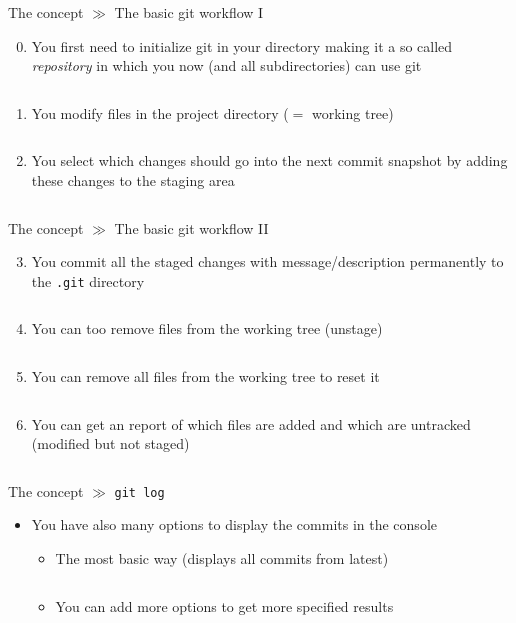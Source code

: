 \documentclass[10pt]{beamer}
\begin{document}
\begin{frame}{The concept $\gg$ The basic git workflow I}
	\begin{enumerate}\setcounter{enumi}{-1}
		\item You first need to initialize git in your directory making it a so called \textit{repository} in which you now (and all subdirectories) can use git
		\inputminted[bgcolor=lightGreyCustom,fontsize=\scriptsize]{sh}{./resources/git_workflow_00_init.sh}
		\item You modify files in the project directory ($=$ working tree)
		\inputminted[bgcolor=lightGreyCustom,fontsize=\scriptsize]{sh}{./resources/git_workflow_01_modify.sh}
		\item You select which changes should go into the next commit snapshot by adding these changes to the staging area
		\inputminted[bgcolor=lightGreyCustom,fontsize=\scriptsize]{sh}{./resources/git_workflow_02_stage.sh}
	\end{enumerate}
\end{frame}

\begin{frame}{The concept $\gg$ The basic git workflow II}
	\begin{enumerate}\setcounter{enumi}{2}
		\item You commit all the staged changes with message/description permanently to the \texttt{.git} directory
		\inputminted[bgcolor=lightGreyCustom,fontsize=\scriptsize]{sh}{./resources/git_workflow_03_commit.sh}
		\item You can too remove files from the working tree (unstage)
		\inputminted[bgcolor=lightGreyCustom,fontsize=\scriptsize]{sh}{./resources/git_workflow_04_unstage.sh}
		\item You can remove all files from the working tree to reset it
		\inputminted[bgcolor=lightGreyCustom,fontsize=\scriptsize]{sh}{./resources/git_workflow_05_reset.sh}
		\item You can get an report of which files are added and which are untracked (modified but not staged)
		\inputminted[bgcolor=lightGreyCustom,fontsize=\scriptsize]{sh}{./resources/git_workflow_06_status.sh}
	\end{enumerate}
\end{frame}

\begin{frame}{The concept $\gg$ \texttt{git log}}
	\begin{itemize}
		\item You have also many options to display the commits in the console
		\begin{itemize}
			\item The most basic way (displays all commits from latest)
			\inputminted[bgcolor=lightGreyCustom,fontsize=\scriptsize]{sh}{./resources/git_log_01_normal.sh}
			\item You can add more options to get more specified results
			\inputminted[bgcolor=lightGreyCustom,fontsize=\scriptsize]{sh}{./resources/git_log_02_options.sh}
		\end{itemize}
	\end{itemize}
\end{frame}
\end{document}

